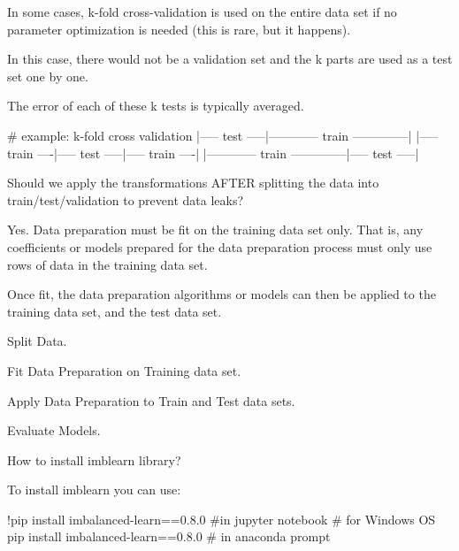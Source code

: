\begin{qanda}
\begin{answer}
\begin{bulletedlist}
	\item In some cases, k-fold cross-validation is used on the entire data set if no parameter optimization is needed (this is rare, but it happens).
	\item In this case, there would not be a validation set and the k parts are used as a test set one by one.
	\item The error of each of these k tests is typically averaged.
\end{bulletedlist}
		\begin{code}[\codenumbering]{}
			\codeitemnonumber \# example: k-fold cross validation
			\codeitemnonumber
			\codeitemnonumber |----- test -----|------------ train --------------|
			\codeitemnonumber |----- train ----|----- test -----|----- train ----|
			\codeitemnonumber |------------ train --------------|----- test -----|
		\end{code}
		\end{answer}
	\end{qanda}

	\begin{qanda}
		\begin{question}
Should we apply the transformations AFTER splitting the data into train/test/validation to prevent data leaks?
		\end{question}

		\begin{answer}Yes. Data preparation must be fit on the training data set only. That is, any coefficients or models prepared for the data preparation process must only use rows of data in the training data set.

Once fit, the data preparation algorithms or models can then be applied to the training data set, and the test data set.
			\begin{numberedlist}
				\item Split Data.
				\item Fit Data Preparation on Training data set.
				\item Apply Data Preparation to Train and Test data sets.
				\item Evaluate Models.
			\end{numberedlist}
		\end{answer}
	\end{qanda}

	\begin{qanda}
		\begin{question}
How to install imblearn library?
		\end{question}

		\begin{answer}
To install imblearn you can use:
			\begin{code}[\codenumbering]{}
				!pip install imbalanced-learn==0.8.0 \#in jupyter notebook \# for Windows OS
				pip install imbalanced-learn==0.8.0 \# in anaconda prompt
			\end{code}
		\end{answer}
	\end{qanda}


